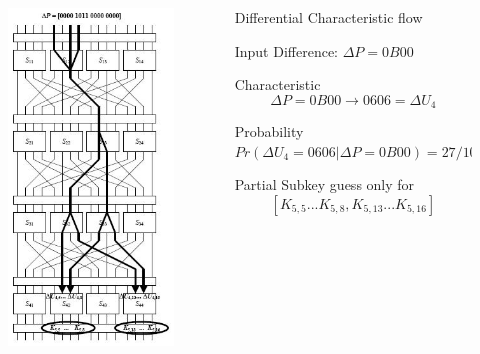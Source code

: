 \documentclass[9pt]{beamer}
\begin{document}
\begin{frame}
\begin{columns}
\begin{column}{0.4\textwidth}
\begin{figure}
\includegraphics[totalheight=0.8\textheight]{spn_diff_char.jpg}
\end{figure}
\end{column}

\begin{column}{0.6\textwidth}
Differential Characteristic flow

\vspace{5mm}
\pause Input Difference: $\Delta P = 0B00$ 

\vspace{2mm}
\pause Characteristic
\[ \Delta P = 0B00 \rightarrow 0606 = \Delta U_4 \]

\vspace{2mm}
Probability $Pr(\Delta U_4 = 0606 | \Delta P = 0B00) = 27/1024$

\vspace{5mm}
\pause Partial Subkey guess only for
\[ [K_{5,5} ... K_{5,8}, K_{5,13} ... K_{5,16}] \]
\end{column}
\end{columns}

\end{frame}
\end{document}

